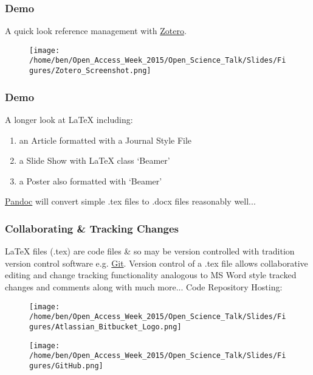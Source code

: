 \documentclass[xcolor=dvipsnames]{beamer}
\begin{document}
\begin{frame}
\frametitle{Demo}
A quick look reference management with \href{https://www.zotero.org/}{Zotero}.
\begin{center}
\begin{figure}
\texttt{[image: /home/ben/Open\_Access\_Week\_2015/Open\_Science\_Talk/Slides/Figures/Zotero\_Screenshot.png]}
\end{figure}
\end{center}


\end{frame}

\begin{frame}
\frametitle{Demo}
A longer look at LaTeX including: \begin{enumerate}  
      \item an Article formatted with a Journal Style File
\newline
      \item a Slide Show with LaTeX class `Beamer'
\newline
      \item a Poster also formatted with `Beamer'
\newline
\newline
\end{enumerate}
\href{http://pandoc.org/}{Pandoc} will convert simple .tex files to .docx files reasonably well...
\end{frame}

\begin{frame}
\frametitle{Collaborating \& Tracking Changes}
LaTeX files (.tex) are code files \& so may be version controlled with tradition version control software e.g. \href{https://git-scm.com/}{Git}.
\newline
\newline
Version control of a .tex file allows collaborative editing and change tracking functionality analogous to MS Word style tracked changes and comments along with much more...
\newline
\newline
Code Repository Hosting:
\begin{center}

\begin{figure}
\texttt{[image: /home/ben/Open\_Access\_Week\_2015/Open\_Science\_Talk/Slides/Figures/Atlassian\_Bitbucket\_Logo.png]}
\end{figure}

\begin{figure}
\texttt{[image: /home/ben/Open\_Access\_Week\_2015/Open\_Science\_Talk/Slides/Figures/GitHub.png]}
\end{figure}
\end{center}
\end{frame}
\end{document}
